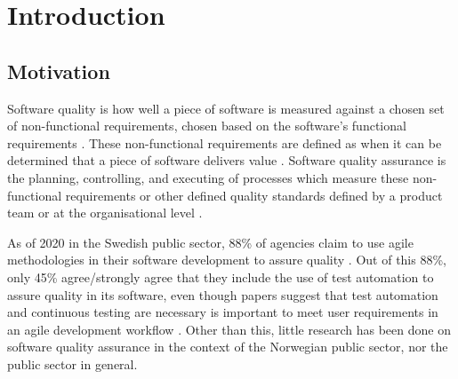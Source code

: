 \chapter{Introduction}

\section{Motivation} \label{sec:motivation}
Software quality is how well a piece of software is measured against a chosen set of non-functional requirements, chosen based on the software's functional requirements \cite{iso_25010:2011}. These non-functional requirements are defined as when it can be determined that a piece of software delivers value \cite{iso_25010:2011}. Software quality assurance is the planning, controlling, and executing of processes which measure these non-functional requirements or other defined quality standards defined by a product team or at the organisational level \cite{ieee_730_2014}\cite{sqa_wiki_2023}. 



As of 2020 in the Swedish public sector, 88\% of agencies claim to use agile methodologies in their software development to assure quality \cite{mb_2020}. Out of this 88\%, only 45\% agree/strongly agree that they include the use of test automation to assure quality in its software, even though papers suggest that test automation and continuous testing are necessary is important to meet user requirements in an agile development workflow \cite{vk_2010}. Other than this, little research has been done on software quality assurance in the context of the Norwegian public sector, nor the public sector in general. 

